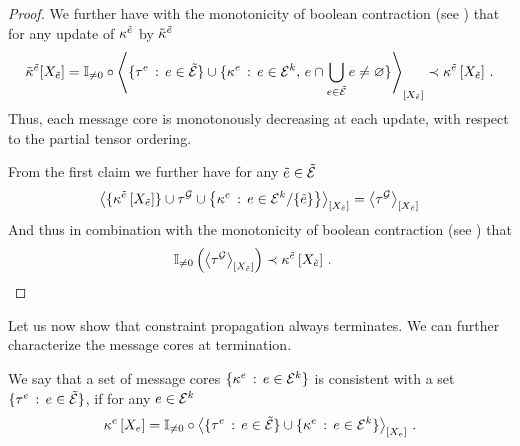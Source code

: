 \begin{proof}
    We further have with the monotonicity of boolean contraction (see ) that for any update of $\kappa^{\tilde{e}}$ by $\tilde{\kappa}^{\tilde{e}}$
    \begin{align*}
        \tilde{\kappa}^{\tilde{e}}[X_{\tilde{e}}]
        = \mathbb{I}_{\neq0}\circ\left\langle 
            \{\tau^{e} \,:\, e\in\tilde{\mathcal{E}}\}
            \cup \{\kappa^{e} \,:\, e\in\mathcal{E}^{k}, \, e\cap\bigcup_{e\in\tilde{\mathcal{E}}}e\neq\varnothing\}
        \right\rangle_{\left[ X_{\tilde{e}} \right]}
        \prec \kappa^{\tilde{e}}\left[X_{\tilde{e}}\right] \, .
    \end{align*}
    Thus, each message core is monotonously decreasing at each update, with respect to the partial tensor ordering.

    From the first claim we further have for any $\tilde{e}\in\tilde{\mathcal{E}}$
    \begin{align*}
        \left\langle \{\kappa^{\tilde{e}}\left[X_{\tilde{e}}\right]\}\cup\tau^{\mathcal{G}} \cup \left\{\kappa^{e} \,:\, e\in\mathcal{E}^{k}/\{\tilde{e}\}\right\}\right\rangle_{\left[ X_{\tilde{e}} \right]}
        = \left\langle \tau^{\mathcal{G}}\right\rangle_{\left[ X_{\tilde{e}} \right]}
    \end{align*}
    And thus in combination with the monotonicity of boolean contraction (see ) that
    \begin{align*}
        \mathbb{I}_{\neq0}\left(\left\langle \tau^{\mathcal{G}}\right\rangle_{\left[ X_{\tilde{e}} \right]}\right) \prec \kappa^{\tilde{e}}\left[X_{\tilde{e}}\right]  \, . & \qedhere
    \end{align*}
\end{proof}

Let us now show that constraint propagation always terminates.
We can further characterize the message cores at termination.

\begin{definition}
    We say that a set of message cores $\{\kappa^{e} \,:\, e\in\mathcal{E}^{k}\}$ is consistent with a set $\{\tau^{e} \,:\, e\in\tilde{\mathcal{E}}\}$, if for any $e\in\mathcal{E}^{k}$
    \begin{align*}
        \kappa^{e}\left[X_{e}\right]
        = \mathbb{I}_{\neq0}\circ\left\langle \{\tau^{e} \,:\, e\in\tilde{\mathcal{E}}\} \cup \{\kappa^{e} \,:\, e\in\mathcal{E}^{k}\}\right\rangle_{\left[ X_{e} \right]} \, .
    \end{align*}
\end{definition}

